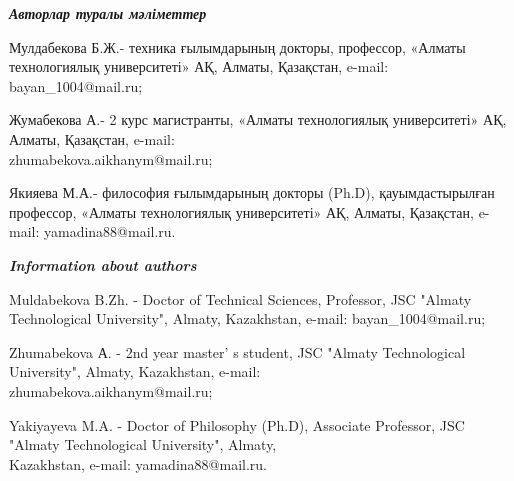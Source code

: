 \begin{authorinfo}
\emph{{\bfseries Авторлар туралы мәліметтер}}

Мулдабекова Б.Ж.- техника ғылымдарының докторы, профессор, «Алматы
технологиялық университеті» АҚ, Алматы, Қазақстан, e-mail: bayan\_1004@mail.ru;

Жумабекова А.- 2 курс магистранты, «Алматы технологиялық университеті»
АҚ, Алматы, Қазақстан, e-mail: \\zhumabekova.aikhanym@mail.ru;

Якияева М.А.- философия ғылымдарының докторы (Ph.D), қауымдастырылған
профессор, «Алматы технологиялық университеті» АҚ, Алматы, Қазақстан, e-mail:
yamadina88@mail.ru.

\emph{{\bfseries Information about authors}}

Muldabekova B.Zh. - Doctor of Technical Sciences, Professor, JSC "Almaty
Technological University", Almaty, Kazakhstan, e-mail:
bayan\_1004@mail.ru;

Zhumabekova А. - 2nd year master' s student, JSC "Almaty
Technological University", Almaty, Kazakhstan, e-mail:\\
zhumabekova.aikhanym@mail.ru;

Yakiyayeva M.A. - Doctor of Philosophy (Ph.D), Associate Professor, JSC
"Almaty Technological University", Almaty, \\Kazakhstan, e-mail:
yamadina88@mail.ru.
\end{authorinfo}
